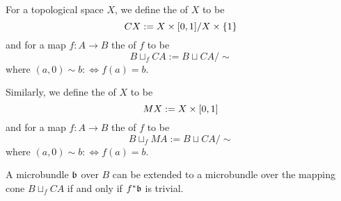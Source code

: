 
\begin{myparagraph}
    For a topological space $X$, we define the  of $X$ to be 
    \[ CX := X \times [0, 1] / X \times \{1\} \]
    and for a map $f: A \to B$ the  of $f$ to be
    \[ B \sqcup_f CA := B \sqcup CA / \sim \]
    where $(a, 0) \sim b :\iff f(a) = b$.
    
    Similarly, we define the  of $X$ to be
    \[ MX := X \times [0, 1] \]
    and for a map $f: A \to B$ the  of $f$ to be
    \[ B \sqcup_f MA := B \sqcup CA / \sim \]
    where $(a, 0) \sim b :\iff f(a) = b$.
\end{myparagraph}

\begin{mylemma}
    A microbundle $\mathfrak{b}$ over $B$ can be extended to a microbundle over the mapping cone $B \sqcup_f CA$ if and only if $f^*\mathfrak{b}$ is trivial.
\end{mylemma}
